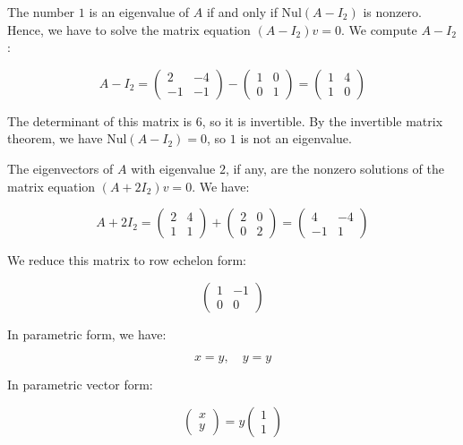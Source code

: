 \documentclass[a4paper,12pt]{article}
\begin{document}
\begin{frame}
The number \( 1 \) is an eigenvalue of \( A \) if and only if \( \text{Nul}(A - I_2) \) is nonzero. Hence, we have to solve the matrix equation \( (A - I_2)v = 0 \). We compute \( A - I_2 \):

\[
A - I_2 = \begin{pmatrix}
2 & -4 \\
-1 & -1
\end{pmatrix} - \begin{pmatrix}
1 & 0 \\
0 & 1
\end{pmatrix}
= \begin{pmatrix}
1 & 4 \\
1 & 0
\end{pmatrix}
\]

The determinant of this matrix is \( 6 \), so it is invertible. By the invertible matrix theorem, we have \( \text{Nul}(A - I_2) = 0 \), so \( 1 \) is not an eigenvalue.

The eigenvectors of \( A \) with eigenvalue \( 2 \), if any, are the nonzero solutions of the matrix equation \( (A + 2I_2)v = 0 \). We have:

\[
A + 2I_2 = \begin{pmatrix}
2 & 4 \\
1 & 1
\end{pmatrix} + \begin{pmatrix}
2 & 0 \\
0 & 2
\end{pmatrix}
= \begin{pmatrix}
4 & -4 \\
-1 & 1
\end{pmatrix}
\]

We reduce this matrix to row echelon form:

\[
\begin{pmatrix}
1 & -1 \\
0 & 0
\end{pmatrix}
\]

In parametric form, we have:

\[
x = y, \quad y = y
\]

In parametric vector form:

\[
\begin{pmatrix}
x \\
y
\end{pmatrix} = y \begin{pmatrix} 1 \\ 1 \end{pmatrix}
\]


\end{frame}
\end{document}
